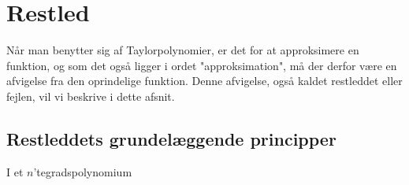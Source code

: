 \chapter{Restled}

Når man benytter sig af Taylorpolynomier, er det for at approksimere en funktion, og som det også ligger i ordet "approksimation", må der derfor være en afvigelse fra den oprindelige funktion. Denne afvigelse, også kaldet restleddet eller fejlen, vil vi beskrive i dette afsnit.

\section{Restleddets grundelæggende principper}
I et $n$'tegradspolynomium